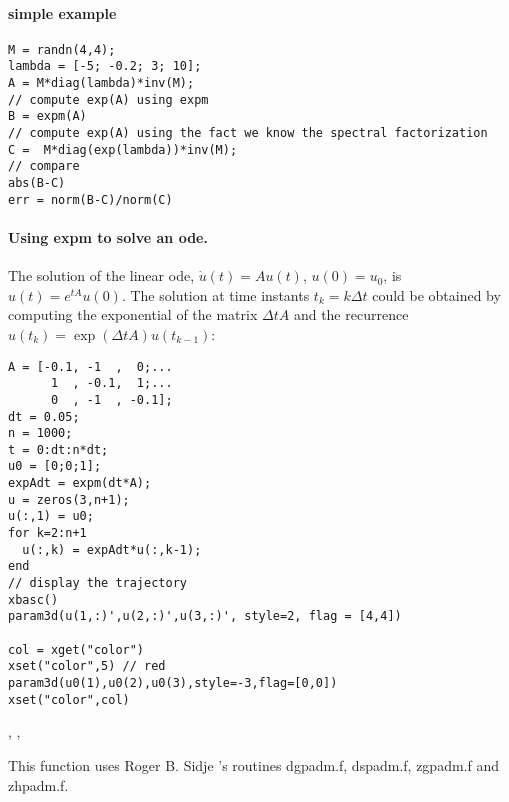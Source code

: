 \begin{examples}

\paragraph{simple example}
\begin{Verbatim}
M = randn(4,4);
lambda = [-5; -0.2; 3; 10];
A = M*diag(lambda)*inv(M);
// compute exp(A) using expm 
B = expm(A)
// compute exp(A) using the fact we know the spectral factorization
C =  M*diag(exp(lambda))*inv(M);
// compare
abs(B-C)
err = norm(B-C)/norm(C)
\end{Verbatim}

\paragraph{Using expm to solve an ode.} The solution of the linear ode, $\dot{u}(t) = A u(t)$, $u(0)=u_0$,
is $u(t) = e^{tA} u(0)$. The solution at time instants $t_k = k \Delta t$ could be
obtained by computing the exponential of the matrix $\Delta t A$ and the recurrence 
$u(t_k) = \exp(\Delta t A) u(t_{k-1})$:  
\begin{Verbatim}
A = [-0.1, -1  ,  0;...
      1  , -0.1,  1;...
      0  , -1  , -0.1];
dt = 0.05;
n = 1000;
t = 0:dt:n*dt;
u0 = [0;0;1];
expAdt = expm(dt*A);
u = zeros(3,n+1);
u(:,1) = u0;
for k=2:n+1
  u(:,k) = expAdt*u(:,k-1);
end
// display the trajectory
xbasc()
param3d(u(1,:)',u(2,:)',u(3,:)', style=2, flag = [4,4])

col = xget("color")
xset("color",5) // red
param3d(u0(1),u0(2),u0(3),style=-3,flag=[0,0]) 
xset("color",col)
\end{Verbatim}
\end{examples}

\begin{manseealso}
  , ,   
\end{manseealso}

\begin{authors}
  This function uses Roger B. Sidje 's routines dgpadm.f, dspadm.f, zgpadm.f and zhpadm.f.
\end{authors}
